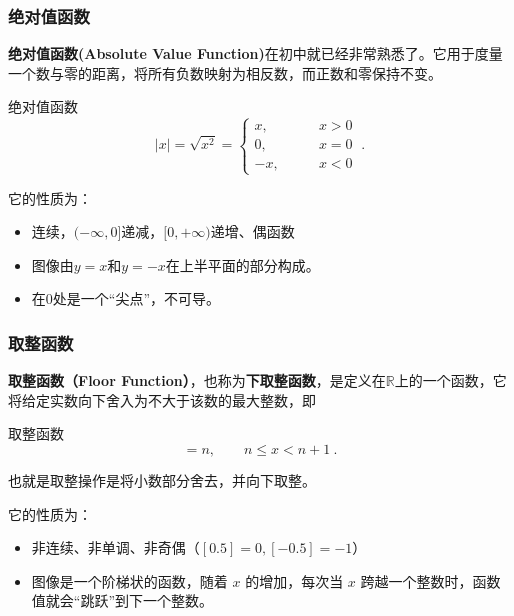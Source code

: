 \subsubsection{绝对值函数}

\textbf{绝对值函数(Absolute Value Function)}在初中就已经非常熟悉了。它用于度量一个数与零的距离，将所有负数映射为相反数，而正数和零保持不变。

\begin{definition}{绝对值函数}\label{def_HsFunC_2}
\begin{equation}
|x| =\sqrt{x^2}=
\begin{cases}
x,\qquad&x > 0 \\
0,\qquad&x=0\\
-x,\qquad&x < 0
\end{cases}~.
\end{equation}
\end{definition}

它的性质为：
\begin{itemize}
\item 连续，$(-\infty,0]$递减，$[0,+\infty)$递增、偶函数
\item 图像由$y=x$和$y=-x$在上半平面的部分构成。
\item 在$0$处是一个“尖点”，不可导。
\end{itemize}

\subsubsection{取整函数}

\textbf{取整函数（Floor Function）}，也称为\textbf{下取整函数}，是定义在$\mathbb{R}$上的一个函数，它将给定实数向下舍入为不大于该数的最大整数，即

\begin{definition}{取整函数}
\begin{equation}
[x] = n,\qquad n \leq x<n+1~.
\end{equation}
\end{definition}

也就是取整操作是将小数部分舍去，并向下取整。


它的性质为：
\begin{itemize}
\item 非连续、非单调、非奇偶（$[0.5]=0,[-0.5]=-1$）
\item 图像是一个阶梯状的函数，随着 $x$ 的增加，每次当 $x$ 跨越一个整数时，函数值就会“跳跃”到下一个整数。
\end{itemize}

